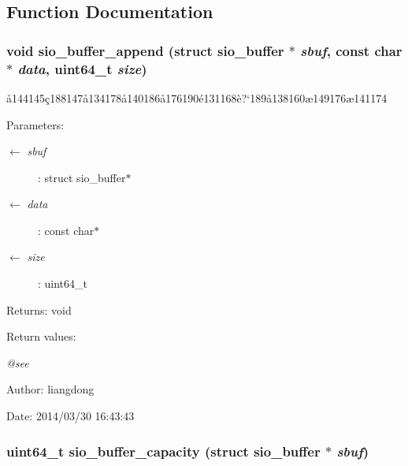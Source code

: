 \subsection{Function Documentation}
\subsubsection{\setlength{\rightskip}{0pt plus 5cm}void sio\_\-buffer\_\-append (struct sio\_\-buffer $\ast$ {\em sbuf}, const char $\ast$ {\em data}, uint64\_\-t {\em size})}\label{sio__buffer_8c_a5}


\aa{}144145\c{c}188147\aa{}134178\aa{}140186\aa{}176190\'{e}131168\`{e}?`189\aa{}138160\ae{}149176\ae{}141174 

\begin{Desc}
\item[Parameters:]
\begin{description}
\item[\mbox{$\leftarrow$} {\em sbuf}]: struct sio\_\-buffer$\ast$ \item[\mbox{$\leftarrow$} {\em data}]: const char$\ast$ \item[\mbox{$\leftarrow$} {\em size}]: uint64\_\-t \end{description}
\end{Desc}
\begin{Desc}
\item[Returns:]void \end{Desc}
\begin{Desc}
\item[Return values:]
\begin{description}
\item[{\em @see}]\end{description}
\end{Desc}
\begin{Desc}
\item[Author:]liangdong \end{Desc}
\begin{Desc}
\item[Date:]2014/03/30 16:43:43 \end{Desc}
\subsubsection{\setlength{\rightskip}{0pt plus 5cm}uint64\_\-t sio\_\-buffer\_\-capacity (struct sio\_\-buffer $\ast$ {\em sbuf})}\label{sio__buffer_8c_a9}


